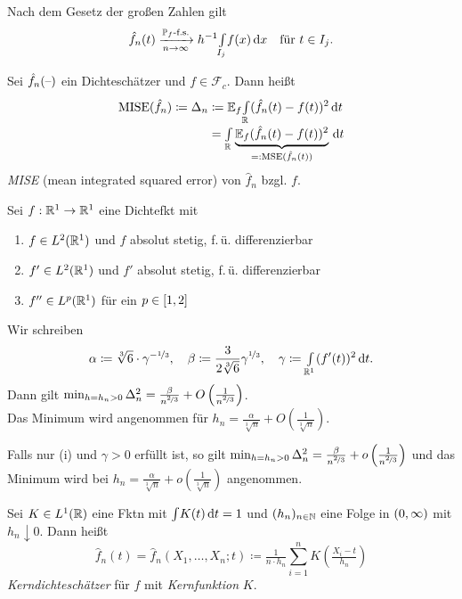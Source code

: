 \documentclass{cheat-sheet}
\renewcommand{\P}{\mathbb{P}} %
\newcommand{\E}{\mathbb{E}} %
\DeclareMathOperator{\MISE}{MISE} %
\DeclareMathOperator{\MSE}{MSE} %
\begin{document}
\begin{bem}
  Nach dem Gesetz der großen Zahlen gilt
  \[
    \hat{f}_n(t) \xra[n \to \infty]{\text{$\P_f$-f.s.}}
    h^{-1} \Int{I_j}{}{f(x)}{x} \quad
    \text{für $t \in I_j$.}
  \]
\end{bem}

\begin{defn}
  Sei $\hat{f}_n(\text{--})$ ein Dichteschätzer und $f \in \mathcal{F}_c$.
  Dann heißt
  \begin{align*}
    \MISE(\hat{f}_n) \coloneqq \Delta_n & \coloneqq \E_f \Int{\R}{}{(\hat{f}_n(t) - f(t))^2}{t} \\[-4pt]
    & = \Int{\R}{}{\underbrace{\E_f (\hat{f}_n(t) - f(t))^2}_{=: \MSE(\hat{f}_n(t))}}{t}
  \end{align*}
  \emph{MISE} (mean integrated squared error) von $\hat{f}_n$ bzgl. $f$.
\end{defn}

\begin{satz}
  Sei $f : \mathbb{R}^1 \to \mathbb{R}^1$ eine Dichtefkt mit
  \begin{enumerate}[label=(\roman*), itemindent=10pt]
    \item $f \in L^2(\mathbb{R}^1)$ und $f$ absolut stetig, \dh{} f.\,ü. differenzierbar
    \item $f' \in L^2(\mathbb{R}^1)$ und $f'$ absolut stetig, \dh{} f.\,ü. differenzierbar
    \item $f'' \in L^p(\mathbb{R}^1)$ für ein $p \in \left[ 1, 2 \right]$
  \end{enumerate}
  Wir schreiben
  \[
    \alpha \coloneqq \sqrt[3]{6} \cdot \gamma^{- \nicefrac{1}{3}}, \quad
    \beta \coloneqq \frac{3}{2 \sqrt[3]{6}} \gamma^{\nicefrac{1}{3}}, \quad
    \gamma \coloneqq {\textstyle \int\limits_{\mathbb{R}^1}^{}} (f'(t))^2 \,\mathrm{d} t.
  \]
  Dann gilt \enspace
  $\min_{h = h_n > 0} \Delta_n^2 = \tfrac{\beta}{n^{\nicefrac{2}{3}}} + O \left( \tfrac{1}{n^{\nicefrac{2}{3}}} \right)$. \\
  Das Minimum wird angenommen für \enspace
  $h_n = \tfrac{\alpha}{\sqrt[3]{n}} + O \left( \tfrac{1}{\sqrt[3]{n}} \right)$.

  Falls nur (i) und $\gamma > 0$ erfüllt ist, so gilt
  $\min_{h = h_n > 0} \Delta_n^2 = \tfrac{\beta}{n^{\nicefrac{2}{3}}} + o \left( \tfrac{1}{n^{\nicefrac{2}{3}}} \right)$ und das Minimum wird bei $h_n = \tfrac{\alpha}{\sqrt[3]{n}} + o \left( \tfrac{1}{\sqrt[3]{n}} \right)$ angenommen.
\end{satz}

\begin{defn}
  Sei $K \in L^1(\mathbb{R})$ eine Fktn mit ${\textstyle \int} K(t) \,\mathrm{d} t = 1$ und $(h_n)_{n \in \mathbb{N}}$ eine Folge in $\left( 0, \infty \right)$ mit $h_n \downarrow 0$.
  Dann heißt
  \[
    \hat{f}_n(t) = \hat{f}_n(X_1, \ldots, X_n; t) \coloneqq \tfrac{1}{n \cdot h_n} \sum_{i=1}^n K \left( \tfrac{X_i - t}{h_n} \right)
  \]
  \emph{Kerndichteschätzer} für $f$ mit \emph{Kernfunktion} $K$.
\end{defn}
\end{document}
